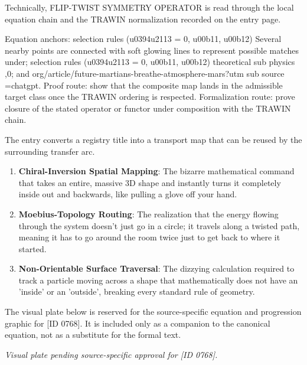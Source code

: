Technically, FLIP-TWIST SYMMETRY OPERATOR is read through the local equation chain and the TRAWIN normalization recorded on the entry page.

Equation anchors: selection rules (u0394u2113 = 0, u00b11, u00b12) Several nearby points are connected with soft glowing lines to represent possible matches under; selection rules (u0394u2113 = 0, u00b11, u00b12) theoretical sub physics ,0; and org/article/future-martians-breathe-atmosphere-mars?utm sub source =chatgpt. Proof route: show that the composite map lands in the admissible target class once the TRAWIN ordering is respected. Formalization route: prove closure of the stated operator or functor under composition with the TRAWIN chain.

The entry converts a registry title into a transport map that can be reused by the surrounding transfer arc.
\endgroup

\begin{enumerate}[leftmargin=1.6em,itemsep=6pt,topsep=4pt]
\item \textbf{Chiral-Inversion Spatial Mapping}: The bizarre mathematical command that takes an entire, massive 3D shape and instantly turns it completely inside out and backwards, like pulling a glove off your hand.
\item \textbf{Moebius-Topology Routing}: The realization that the energy flowing through the system doesn't just go in a circle; it travels along a twisted path, meaning it has to go around the room twice just to get back to where it started.
\item \textbf{Non-Orientable Surface Traversal}: The dizzying calculation required to track a particle moving across a shape that mathematically does not have an 'inside' or an 'outside', breaking every standard rule of geometry.
\end{enumerate}

\begingroup\footnotesize\sloppy
The visual plate below is reserved for the source-specific equation and progression graphic for [ID 0768]. It is included only as a companion to the canonical equation, not as a substitute for the formal text.
\par\endgroup
\begingroup\footnotesize\itshape
Visual plate pending source-specific approval for [ID 0768].
\par\endgroup

